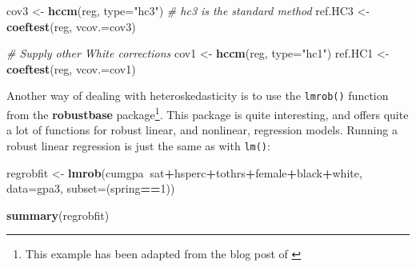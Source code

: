 \documentclass[]{book}
\newenvironment{Shaded}{\begin{snugshade}}{\end{snugshade}}
\newcommand{\CommentTok}[1]{\textcolor[rgb]{0.56,0.35,0.01}{\textit{#1}}}
\newcommand{\DataTypeTok}[1]{\textcolor[rgb]{0.13,0.29,0.53}{#1}}
\newcommand{\DecValTok}[1]{\textcolor[rgb]{0.00,0.00,0.81}{#1}}
\newcommand{\KeywordTok}[1]{\textcolor[rgb]{0.13,0.29,0.53}{\textbf{#1}}}
\newcommand{\NormalTok}[1]{#1}
\newcommand{\OperatorTok}[1]{\textcolor[rgb]{0.81,0.36,0.00}{\textbf{#1}}}
\newcommand{\StringTok}[1]{\textcolor[rgb]{0.31,0.60,0.02}{#1}}
\let\rmarkdownfootnote\footnote%
\def\footnote{\protect\rmarkdownfootnote}
\begin{document}
\begin{Shaded}
\begin{Highlighting}[]
\NormalTok{cov3 <-}\StringTok{ }\KeywordTok{hccm}\NormalTok{(reg, }\DataTypeTok{type=}\StringTok{"hc3"}\NormalTok{) }\CommentTok{# hc3 is the standard method}
\NormalTok{ref.HC3 <-}\StringTok{ }\KeywordTok{coeftest}\NormalTok{(reg, }\DataTypeTok{vcov.=}\NormalTok{cov3)}

\CommentTok{# Supply other White corrections}
\NormalTok{cov1 <-}\StringTok{ }\KeywordTok{hccm}\NormalTok{(reg, }\DataTypeTok{type=}\StringTok{"hc1"}\NormalTok{)}
\NormalTok{ref.HC1 <-}\StringTok{ }\KeywordTok{coeftest}\NormalTok{(reg, }\DataTypeTok{vcov.=}\NormalTok{cov1)}
\end{Highlighting}
\end{Shaded}

Another way of dealing with heteroskedasticity is to use the \texttt{lmrob()} function from the \textbf{robustbase} package\footnote{This example has been adapted from the blog post of \citet{Rodrigues2018}}. This package is quite interesting, and offers quite a lot of functions for robust linear, and nonlinear, regression models. Running a robust linear regression is just the same as with \texttt{lm()}:

\begin{Shaded}
\begin{Highlighting}[]
\NormalTok{regrobfit <-}\StringTok{ }\KeywordTok{lmrob}\NormalTok{(cumgpa}\OperatorTok{~}\NormalTok{sat}\OperatorTok{+}\NormalTok{hsperc}\OperatorTok{+}\NormalTok{tothrs}\OperatorTok{+}\NormalTok{female}\OperatorTok{+}\NormalTok{black}\OperatorTok{+}\NormalTok{white, }
                   \DataTypeTok{data=}\NormalTok{gpa3, }\DataTypeTok{subset=}\NormalTok{(spring}\OperatorTok{==}\DecValTok{1}\NormalTok{))}

\KeywordTok{summary}\NormalTok{(regrobfit)}
\end{Highlighting}
\end{Shaded}
\end{document}
